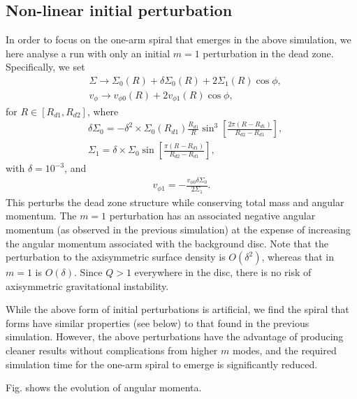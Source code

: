 \subsection{Non-linear initial perturbation}\label{fargo_nonlin}
In order to focus on the one-arm spiral that emerges in the above
simulation, we here analyse a run with only an initial $m=1$
perturbation in the dead zone. Specifically, we set
\begin{align}
  &\Sigma \to \Sigma_0(R) + \delta\Sigma_0(R) + 2\Sigma_1(R)\cos{\phi},\\
  &v_\phi  \to v_{\phi 0}(R) + 2v_{\phi 1}(R)\cos{\phi},
\end{align}
for $R\in[R_{d1},R_{d2}]$, where
\begin{align}
  &\delta\Sigma_0 =
  -\delta^2\times\Sigma_0(R_{d1})\frac{R_{d1}}{R}\sin^3{\left[\frac{2\pi\left(R-R_{d1}\right)}{R_{d2}-R_{d1}}\right]},\\ 
  &\Sigma_1 =
  \delta\times\Sigma_0\sin{\left[\frac{\pi\left(R-R_{d1}\right)}{R_{d2}-R_{d1}}\right]},  
\end{align}
with $\delta = 10^{-3}$, and
\begin{align}
  v_{\phi 1} = -\frac{v_{\phi 0}\delta\Sigma_0}{2\Sigma_1}. 
\end{align}
This perturbs the dead zone structure while conserving total mass and
angular momentum. The $m=1$ perturbation has an associated negative
angular momentum (as observed in the previous simulation) at the
expense of increasing the angular momentum associated with the
background disc. %
Note that the perturbation to the axisymmetric surface density is
$O(\delta^2)$, whereas that in $m=1$ is $O(\delta)$. Since $Q>1$
everywhere in the disc, there is no risk of axisymmetric gravitational
instability. 

While the above form of initial perturbations is artificial, we find 
the spiral that forms have similar properties (see below) to that found in the
previous simulation. However, the above perturbations have the
advantage of producing cleaner results without complications from
higher $m$ modes, and the required simulation time for the one-arm
spiral to emerge is significantly reduced. 

Fig. shows the evolution of angular momenta. 


